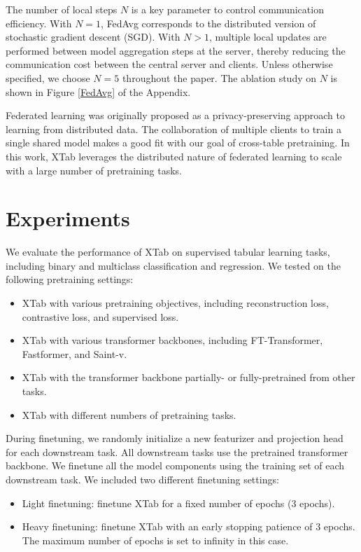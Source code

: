 The number of local steps $N$ is a key parameter to control communication efficiency. With $N=1$, FedAvg corresponds to the distributed version of stochastic gradient descent (SGD). With $N>1$, multiple local updates are performed between model aggregation steps at the server, thereby reducing the communication cost between the central server and clients. Unless otherwise specified, we choose $N=5$ throughout the paper. The ablation study on $N$ is shown in Figure \ref{FedAvg} of the Appendix. 

Federated learning was originally proposed as a privacy-preserving approach to learning from distributed data. The collaboration of multiple clients to train a single shared model makes a good fit with our goal of cross-table pretraining. In this work, XTab leverages the distributed nature of federated learning to scale with a large number of pretraining tasks.

\section{Experiments} 
We evaluate the performance of XTab on supervised tabular learning tasks, including binary and multiclass classification and regression. We tested on the following pretraining settings:

\begin{itemize} 
\itemsep-0.3em 
\item XTab with various pretraining objectives, including reconstruction loss, contrastive loss, and supervised loss.
\item XTab with various transformer backbones, including FT-Transformer, Fastformer, and Saint-v. 
\item XTab with the transformer backbone partially- or fully-pretrained from other tasks.
\item XTab with different numbers of pretraining tasks.

\end{itemize}

During finetuning, we randomly initialize a new featurizer and projection head for each downstream task. All downstream tasks use the pretrained transformer backbone. We finetune all the model components using the training set of each downstream task. We included two different finetuning settings:

\begin{itemize} 
\itemsep-0.3em 
\item Light finetuning: finetune XTab for a fixed number of epochs (3 epochs). 
\item Heavy finetuning: finetune XTab with an early stopping patience of 3 epochs. The maximum number of epochs is set to infinity in this case. 

\end{itemize}

